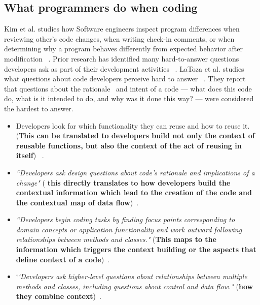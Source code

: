 \subsection{What programmers do when coding}
Kim et al. studies how Software engineers inspect program differences when reviewing other's code changes, when writing check-in comments, or when determining why a program behaves differently from expected behavior after modification ~\cite{Kim:2009}.
Prior research has identified many hard-to-answer questions developers ask as part of their development activities ~\cite{LaToza:2010, Fritz:2010, Ko:2007}. 
LaToza et al. studies what questions about code developers perceive hard to answer ~\cite{LaToza:2010}. They report that questions about the rationale~\cite{LaToza:2006} and intent of a code --- what does this code do, what is it intended to do, and why was it done this way? --- were considered the hardest to answer. 
\begin{itemize}
\item Developers look for which functionality they can reuse and how to reuse it. (T\textbf{his can be translated to developers build not only the context of reusable functions, but also the context of the act of reusing in itself}) ~\cite{Ko:2007}.

\item \textit{``Developers ask design questions about code's rationale and implications of a change"} ( \textbf{this directly translates to how developers build the contextual information which lead to the creation of the code and the contextual map of data flow})~\cite{Ko:2007}.

\item \textit{``Developers begin coding tasks by finding focus points corresponding to domain concepts or application functionality and work outward following relationships between methods and classes." }(\textbf{This maps to the information which triggers the context building or the aspects that define context of a code})~\cite{Sillito:2008}.

\item `\textit{`Developers ask higher-level questions about relationships between multiple methods and classes, including questions about control and data flow."} (\textbf{how they combine context})~\cite{Sillito:2008}.

\end{itemize}

